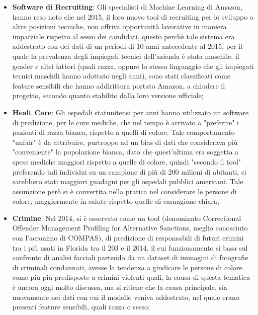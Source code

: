 \begin{itemize}
    \item \textbf{Software di Recruiting}: \cite{amazonrecruiting2018reuters} Gli specialisti di Machine Learning di Amazon, hanno reso noto che nel 2015, il loro nuovo tool di recruiting per lo sviluppo o altre posizioni tecniche, non offriva opportunità lavorative in maniera imparziale rispetto al sesso dei candidati, questo perchè tale sistema era addestrato con dei dati di un periodi di 10 anni antecedente al 2015, per il quale la prevalenza degli impiegati tecnici dell'azienda è stata maschile, il gender e altri fattori (quali razza, oppure lo stesso linguaggio che gli impiegati tecnici maschili hanno adottato negli anni), sono stati classificati come feature sensibili che hanno addirittura portato Amazon, a chiudere il progetto, secondo quanto stabilito dalla loro versione ufficiale;
    
    
    \item \textbf{Healt Care}: \cite{HealtCareBias} Gli ospedali statunitensi per anni hanno utilizzato un software di predizione, per le cure mediche, che nel tempo è arrivato a "preferire" i pazienti di razza bianca, rispetto a quelli di colore. Tale comportamento "unfair" è da attribuire, purtroppo ad un bias di dati che considerava più "conveniente" la popolazione bianca, dato che quest'ultima era soggetta a spese mediche maggiori rispetto a quelle di colore, quindi "secondo il tool" preferendo tali individui su un campione di più di 200 milioni di abitanti, ci sarebbero stati maggiori guadagni per gli ospedali pubblici americani. Tale assunzione però si è convertita nella pratica nel considerare le persone di colore, maggiormente in salute rispetto quelle di carnagione chiara;
    
    \item \textbf{Crimine}: \cite{biasblack2016propublica} Nel 2014, si è osservato come un tool  (denominato Correctional Offender Management Profiling for Alternative Sanctions, meglio conosciuto con l'acronimo di COMPAS), di predizione di responsabili di futuri crimini tra i più usati in Florida tra il 203 e il 2014, il cui funzionamento si basa sul confronto di analisi facciali partendo da  un dataset di immagini di fotografie di criminali condannati, avesse la tendenza a giudicare le persone di colore come più più predisposte a crimini violenti quali, la causa di questa tematica è ancora oggi molto discussa, ma si ritiene che la causa principale, sia nuovamente nei dati con cui il modello veniva addestrato, nel quale erano presenti feature sensibili, quali razza o sesso;
    

\end{itemize}
